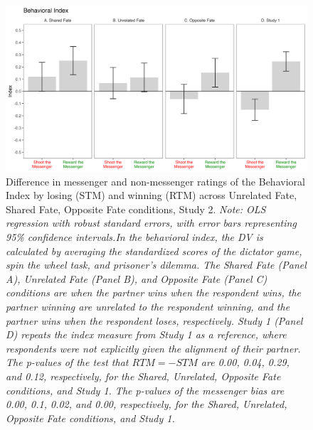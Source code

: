 \renewcommand{\baselinestretch}{1.25}%
\begin{figure}[!t]%
  \centering
  \includegraphics[width=1.0\textwidth]{figures/study2_main_behavior_all.png}
  \caption{Difference in messenger and non-messenger ratings of the Behavioral Index by losing (STM) and winning (RTM) across Unrelated Fate, Shared Fate, Opposite Fate conditions, Study 2. 
  \textit{Note: OLS regression with robust standard errors, with error bars representing 95\% confidence intervals.In the behavioral index, the DV is calculated by averaging the standardized scores of the dictator game, spin the wheel task, and prisoner's dilemma. The Shared Fate (Panel A), Unrelated Fate (Panel B), and Opposite Fate (Panel C) conditions are when the partner wins when the respondent wins, the partner winning are unrelated to the respondent winning, and the partner wins when the respondent loses, respectively. Study 1 (Panel D) repeats the index measure from Study 1 as a reference, where respondents were not explicitly given the alignment of their partner. The p-values of the test that $RTM = -STM$ are 0.00, 0.04, 0.29, and 0.12, respectively, for the Shared, Unrelated, Opposite Fate conditions, and Study 1. The p-values of the messenger bias are 0.00, 0.1, 0.02, and 0.00, respectively, for the Shared, Unrelated, Opposite Fate conditions, and Study 1.}}
  \label{fig:study2_main_behavior_all}
\end{figure}%
\renewcommand{\baselinestretch}{1.67}%
